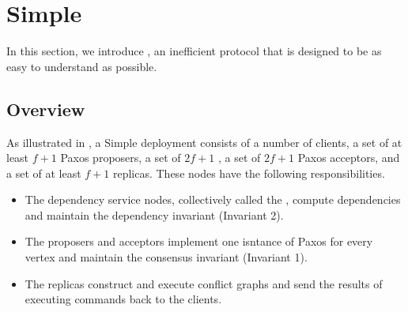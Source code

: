 \section{Simple \BPaxos{}}
In this section, we introduce , an inefficient
\BPaxos{} protocol that is designed to be as easy to understand as possible.

\subsection{Overview}


As illustrated in , a Simple \BPaxos{} deployment consists
of a number of clients, a set of at least $f+1$ Paxos proposers, a set of
$2f+1$ , a set of $2f+1$ Paxos acceptors, and
a set of at least $f+1$ replicas. These nodes have the following responsibilities.
\begin{itemize}
  \item
    The dependency service nodes, collectively called the , compute dependencies and maintain the dependency invariant
    (Invariant 2).
  \item
    The proposers and acceptors implement one isntance of Paxos for every
    vertex and maintain the consensus invariant (Invariant 1).
  \item
    The replicas construct and execute conflict graphs and send the results of
    executing commands back to the clients.
\end{itemize}

